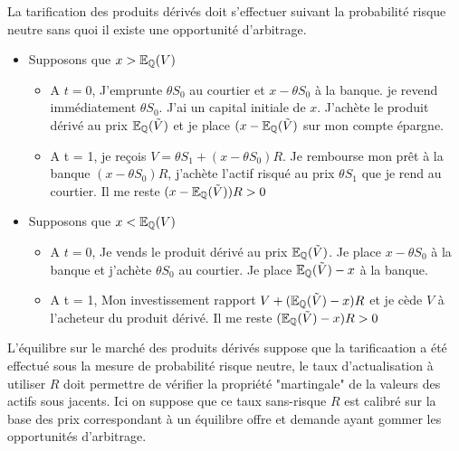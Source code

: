 \begin{remark}
La tarification des produits dérivés doit s'effectuer suivant la probabilité risque neutre sans quoi il existe une opportunité d'arbitrage. 
\begin{itemize}
    \item Supposons que $x > \mathbb{E}_{\mathbb{Q}}(V)$
    \begin{itemize}
        \item A $t=0$, J'emprunte $\theta S_0$ au courtier et $x-\theta S_0$ à la banque. je revend immédiatement $\theta S_0$. J'ai un capital initiale de $x$. J'achète le produit dérivé au prix $\mathbb{E}_{\mathbb{Q}}(\tilde V)$ et je place $(x-\mathbb{E}_{\mathbb{Q}}(\tilde V)$ sur mon compte épargne.  
        \item A t = 1, je reçois $V = \theta S_1 + (x-\theta S_0)R $. Je rembourse mon prêt à la banque $(x-\theta S_0)R$, j'achète l'actif risqué au prix $\theta S_1$ que je rend au courtier. Il me reste $(x-\mathbb{E}_{\mathbb{Q}}(\tilde V))R > 0$
    \end{itemize}
    \item Supposons que $x < \mathbb{E}_{\mathbb{Q}}(V)$
    \begin{itemize}
        \item A $t=0$, Je vends le produit dérivé au prix $\mathbb{E}_{\mathbb{Q}}(\tilde V)$. Je place $x-\theta S_0$ à la banque et j'achète $\theta S_0$ au courtier. Je place $\mathbb{E}_{\mathbb{Q}}(\tilde V)-x$ à la banque. 
        \item A t = 1, Mon investissement rapport $V + (\mathbb{E}_{\mathbb{Q}}(\tilde V)-x)R$ et je cède $V$ à l'acheteur du produit dérivé. Il me reste $(\mathbb{E}_{\mathbb{Q}}(\tilde V)-x)R > 0$
    \end{itemize}
\end{itemize}
L'équilibre sur le marché des produits dérivés suppose que la tarificaation a été effectué sous la mesure de probabilité risque neutre, le taux d'actualisation à utiliser $R$ doit permettre de vérifier la propriété "martingale" de la valeurs des actifs sous jacents. Ici on suppose que ce taux sans-risque $R$ est calibré sur la base des prix correspondant à un équilibre offre et demande ayant gommer les opportunités d'arbitrage.
\end{remark}

